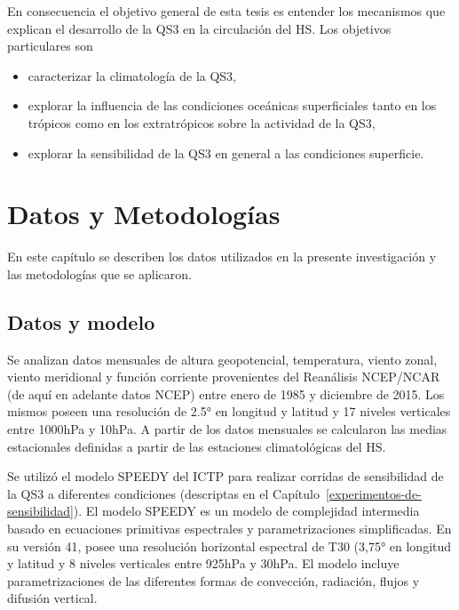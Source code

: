 \documentclass[spanish,a4paper,12pt,oneside]{book}
\providecommand{\tightlist}{%
  \setlength{\itemsep}{0pt}\setlength{\parskip}{0pt}}
\begin{document}
En consecuencia el objetivo general de esta tesis es entender los
mecanismos que explican el desarrollo de la QS3 en la circulación del
HS. Los objetivos particulares son

\begin{itemize}
\tightlist
\item
  caracterizar la climatología de la QS3,
\item
  explorar la influencia de las condiciones oceánicas superficiales
  tanto en los trópicos como en los extratrópicos sobre la actividad de
  la QS3,
\item
  explorar la sensibilidad de la QS3 en general a las condiciones
  superficie.
\end{itemize}

\chapter{Datos y Metodologías}\label{datos-y-metodologias}

En este capítulo se describen los datos utilizados en la presente
investigación y las metodologías que se aplicaron.

\section{Datos y modelo}\label{datos-y-modelo}

Se analizan datos mensuales de altura geopotencial, temperatura, viento
zonal, viento meridional y función corriente provenientes del Reanálisis
NCEP/NCAR \autocite{Kalnay1996} (de aquí en adelante datos NCEP) entre
enero de 1985 y diciembre de 2015. Los mismos poseen una resolución de
2.5° en longitud y latitud y 17 niveles verticales entre 1000hPa y
10hPa. A partir de los datos mensuales se calcularon las medias
estacionales definidas a partir de las estaciones climatológicas del HS.

Se utilizó el modelo SPEEDY del ICTP para realizar corridas de
sensibilidad de la QS3 a diferentes condiciones (descriptas en el
Capítulo~\ref{experimentos-de-sensibilidad}). El modelo SPEEDY
\autocites{Molteni2003}{Kucharski2006} es un modelo de complejidad
intermedia basado en ecuaciones primitivas espectrales y
parametrizaciones simplificadas. En su versión 41, posee una resolución
horizontal espectral de T30 (3,75° en longitud y latitud y 8 niveles
verticales entre 925hPa y 30hPa. El modelo incluye parametrizaciones de
las diferentes formas de convección, radiación, flujos y difusión
vertical.
\end{document}

